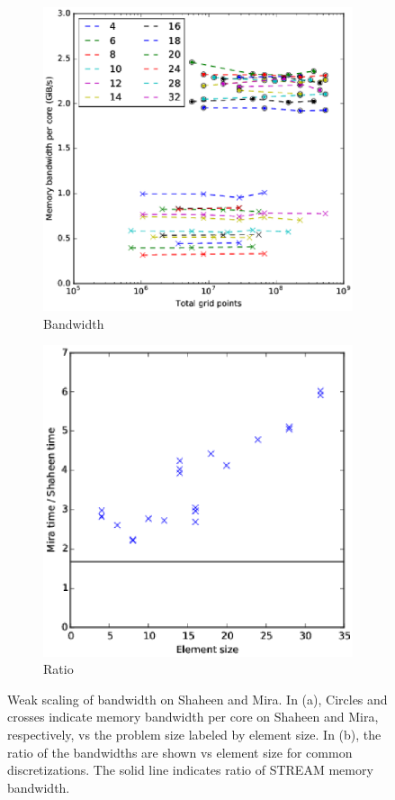 \begin{figure}
\begin{subfigure}[t]{0.49\textwidth}
\includegraphics[width=\textwidth]{gfx/combined-bw}
\caption{Bandwidth}
\end{subfigure}
\begin{subfigure}[t]{0.49\textwidth}
\includegraphics[width=\textwidth]{gfx/mira_vs_haswell}
\caption{Ratio}
\end{subfigure}
\caption{ 
Weak scaling of bandwidth on Shaheen and Mira.
In (a), Circles and crosses indicate memory bandwidth per core on Shaheen and Mira, respectively, vs the problem size labeled by element size.
In (b), the ratio of the bandwidths are shown vs element size for common discretizations.
The solid line indicates ratio of STREAM memory bandwidth.
}

\end{figure}

